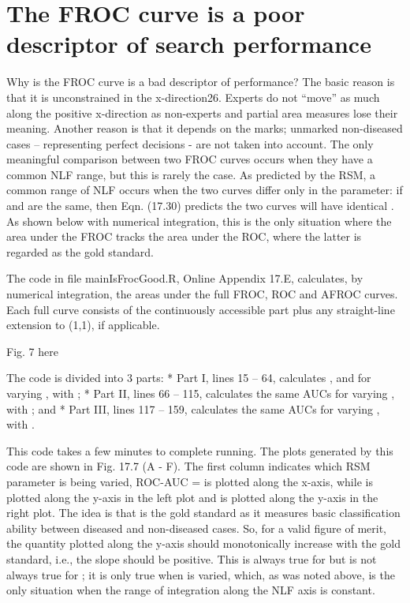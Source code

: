 \documentclass[
]{book}
\begin{document}
\hypertarget{rsm-goodbye-froc-froc-poor}{%
\section{The FROC curve is a poor descriptor of search performance}\label{rsm-goodbye-froc-froc-poor}}

Why is the FROC curve is a bad descriptor of performance? The basic reason is that it is unconstrained in the x-direction26. Experts do not ``move'' as much along the positive x-direction as non-experts and partial area measures lose their meaning. Another reason is that it depends on the marks; unmarked non-diseased cases -- representing perfect decisions - are not taken into account. The only meaningful comparison between two FROC curves occurs when they have a common NLF range, but this is rarely the case. As predicted by the RSM, a common range of NLF occurs when the two curves differ only in the parameter: if and are the same, then Eqn. (17.30) predicts the two curves will have identical . As shown below with numerical integration, this is the only situation where the area under the FROC tracks the area under the ROC, where the latter is regarded as the gold standard.

The code in file mainIsFrocGood.R, Online Appendix 17.E, calculates, by numerical integration, the areas under the full FROC, ROC and AFROC curves. Each full curve consists of the continuously accessible part plus any straight-line extension to (1,1), if applicable.

Fig. 7 here

The code is divided into 3 parts:
* Part I, lines 15 -- 64, calculates , and for varying , with ;
* Part II, lines 66 -- 115, calculates the same AUCs for varying , with ; and
* Part III, lines 117 -- 159, calculates the same AUCs for varying , with .

This code takes a few minutes to complete running. The plots generated by this code are shown in Fig. 17.7 (A - F). The first column indicates which RSM parameter is being varied, ROC-AUC = is plotted along the x-axis, while is plotted along the y-axis in the left plot and is plotted along the y-axis in the right plot. The idea is that is the gold standard as it measures basic classification ability between diseased and non-diseased cases. So, for a valid figure of merit, the quantity plotted along the y-axis should monotonically increase with the gold standard, i.e., the slope should be positive. This is always true for but is not always true for ; it is only true when is varied, which, as was noted above, is the only situation when the range of integration along the NLF axis is constant.
\end{document}
